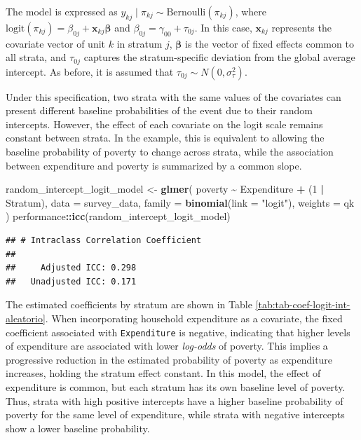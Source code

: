 \documentclass[
  english,
  12pt,
]{book}
\newenvironment{Shaded}{\begin{snugshade}}{\end{snugshade}}
\newcommand{\AttributeTok}[1]{\textcolor[rgb]{0.13,0.29,0.53}{#1}}
\newcommand{\DecValTok}[1]{\textcolor[rgb]{0.00,0.00,0.81}{#1}}
\newcommand{\FunctionTok}[1]{\textcolor[rgb]{0.13,0.29,0.53}{\textbf{#1}}}
\newcommand{\NormalTok}[1]{#1}
\newcommand{\OtherTok}[1]{\textcolor[rgb]{0.56,0.35,0.01}{#1}}
\newcommand{\SpecialCharTok}[1]{\textcolor[rgb]{0.81,0.36,0.00}{\textbf{#1}}}
\newcommand{\StringTok}[1]{\textcolor[rgb]{0.31,0.60,0.02}{#1}}
\begin{document}
The model is expressed as \(y_{kj} \mid \pi_{kj} \sim \text{Bernoulli}(\pi_{kj})\), where \(\text{logit}(\pi_{kj}) = \beta_{0j} + \mathbf{x}_{kj}\boldsymbol{\beta}\) and \(\beta_{0j} = \gamma_{00} + \tau_{0j}\). In this case, \(\mathbf{x}_{kj}\) represents the covariate vector of unit \(k\) in stratum \(j\), \(\boldsymbol{\beta}\) is the vector of fixed effects common to all strata, and \(\tau_{0j}\) captures the stratum-specific deviation from the global average intercept. As before, it is assumed that \(\tau_{0j} \sim N(0,\sigma_{\tau}^{2})\).

Under this specification, two strata with the same values of the covariates can present different baseline probabilities of the event due to their random intercepts. However, the effect of each covariate on the logit scale remains constant between strata. In the example, this is equivalent to allowing the baseline probability of poverty to change across strata, while the association between expenditure and poverty is summarized by a common slope.

\begin{Shaded}
\begin{Highlighting}[]
\NormalTok{random\_intercept\_logit\_model }\OtherTok{\textless{}{-}} \FunctionTok{glmer}\NormalTok{(}
\NormalTok{  poverty }\SpecialCharTok{\textasciitilde{}}\NormalTok{ Expenditure }\SpecialCharTok{+}\NormalTok{ (}\DecValTok{1} \SpecialCharTok{|}\NormalTok{ Stratum),}
  \AttributeTok{data =}\NormalTok{ survey\_data,}
  \AttributeTok{family =} \FunctionTok{binomial}\NormalTok{(}\AttributeTok{link =} \StringTok{"logit"}\NormalTok{),}
  \AttributeTok{weights =}\NormalTok{ qk}
\NormalTok{)}
\NormalTok{performance}\SpecialCharTok{::}\FunctionTok{icc}\NormalTok{(random\_intercept\_logit\_model)}
\end{Highlighting}
\end{Shaded}

\begin{verbatim}
## # Intraclass Correlation Coefficient
## 
##     Adjusted ICC: 0.298
##   Unadjusted ICC: 0.171
\end{verbatim}

The estimated coefficients by stratum are shown in Table \ref{tab:tab-coef-logit-int-aleatorio}. When incorporating household expenditure as a covariate, the fixed coefficient associated with \texttt{Expenditure} is negative, indicating that higher levels of expenditure are associated with lower \emph{log-odds} of poverty. This implies a progressive reduction in the estimated probability of poverty as expenditure increases, holding the stratum effect constant. In this model, the effect of expenditure is common, but each stratum has its own baseline level of poverty. Thus, strata with high positive intercepts have a higher baseline probability of poverty for the same level of expenditure, while strata with negative intercepts show a lower baseline probability.
\end{document}
